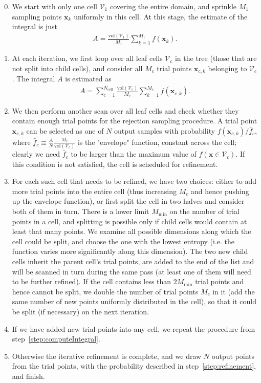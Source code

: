 \documentclass[12pt]{article}
\newcommand{\bx}{\boldsymbol{x}}
\begin{document}
\begin{enumerate}  \setcounter{enumi}{-1}
\item We start with only one cell $\mathcal{V}_1$ covering the entire domain, and sprinkle $M_1$ sampling points $\bx_k$ uniformly in this cell. At this stage, the estimate of the integral is just
\begin{align}
A = \frac{\mathrm{vol}(\mathcal{V}_1)}{M_1} \sum_{k=1}^{M_1} f(\bx_k).
\end{align}
\item \label{step:computeIntegral}
At each iteration, we first loop over all leaf cells $\mathcal{V}_c$ in the tree (those that are not split into child cells), and consider all $M_c$ trial points $\bx_{c,k}$ belonging to $\mathcal{V}_c$. The integral $A$ is estimated as \begin{align}
A = \sum_{c=1}^{N_\mathrm{cell}} \frac{\mathrm{vol}(\mathcal{V}_c)}{M_c} \sum_{k=1}^{M_c} f(\bx_{c,k}).
\end{align}
\item \label{step:refinement} We then perform another scan over all leaf cells and check whether they contain enough trial points for the rejection sampling procedure. A trial point $\bx_{c,k}$ can be selected as one of $N$ output samples with probability $f(\bx_{c,k}) / \bar f_c$, where $\bar f_c \equiv \frac{A}{N} \frac{M_c}{\mathrm{vol}(\mathcal{V}_c)}$ is the "envelope" function, constant across the cell; clearly we need $\bar f_c$ to be larger than the maximum value of $f(\bx\in\mathcal{V}_c)$. If this condition is not satisfied, the cell is scheduled for refinement.
\item For each such cell that needs to be refined, we have two choices: either to add more trial points into the entire cell (thus increasing $M_c$ and hence pushing up the envelope function), or first split the cell in two halves and consider both of them in turn. There is a lower limit $M_\mathrm{min}$ on the number of trial points in a cell, and splitting is possible only if child cells would contain at least that many points. We examine all possible dimensions along which the cell could be split, and choose the one with the lowest entropy (i.e. the function varies more significantly along this dimension). The two new child cells inherit the parent cell's trial points, are added to the end of the list and will be scanned in turn during the same pass (at least one of them will need to be further refined). If the cell contains less than $2M_\mathrm{min}$ trial points and hence cannot be split, we double the number of trial points $M_c$ in it (add the same number of new points uniformly distributed in the cell), so that it could be split (if necessary) on the next iteration.
\item If we have added new trial points into any cell, we repeat the procedure from step~\ref{step:computeIntegral}. 
\item Otherwise the iterative refinement is complete, and we draw $N$ output points from the trial points, with the probability described in step~\ref{step:refinement}, and finish.
\end{enumerate}
\end{document}
